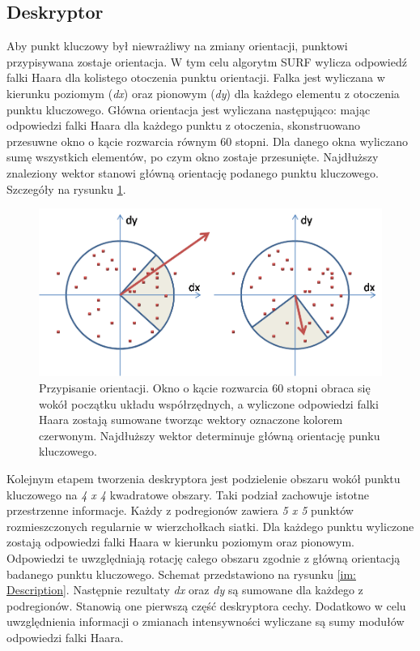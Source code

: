 \subsection{Deskryptor} 
Aby punkt kluczowy był niewrażliwy na zmiany orientacji, punktowi przypisywana zostaje orientacja. W tym celu algorytm SURF wylicza odpowiedź falki Haara dla kolistego otoczenia punktu orientacji. Falka jest wyliczana w kierunku poziomym (\textit{dx}) oraz pionowym (\textit{dy}) dla każdego elementu z otoczenia punktu kluczowego.
Główna orientacja jest wyliczana następująco: mając odpowiedzi falki Haara dla każdego punktu z otoczenia, skonstruowano przesuwne okno o kącie rozwarcia równym 60 stopni. Dla danego okna wyliczano sumę wszystkich elementów, po czym okno zostaje przesunięte. Najdłuższy znaleziony wektor stanowi główną orientację podanego punktu kluczowego. Szczegóły na rysunku \ref{im: SurfOrientationTwo}.

 \begin{figure}[h]
	\includegraphics[width=16cm]{SurfOrientationTwo}
	\centering
	\caption{Przypisanie orientacji. Okno o kącie rozwarcia 60 stopni obraca się wokół początku układu współrzędnych, a wyliczone odpowiedzi falki Haara zostają sumowane tworząc wektory oznaczone kolorem czerwonym. Najdłuższy wektor determinuje główną orientację punku kluczowego.}
	\label{im: SurfOrientationTwo}
\end{figure}

Kolejnym etapem tworzenia deskryptora jest podzielenie obszaru wokół punktu kluczowego na  \textit{4 x 4} kwadratowe obszary. Taki podział zachowuje istotne przestrzenne informacje. Każdy z podregionów zawiera \textit{5 x 5} punktów rozmieszczonych regularnie w wierzchołkach siatki. Dla każdego punktu wyliczone zostają odpowiedzi falki Haara w kierunku poziomym oraz pionowym. Odpowiedzi te uwzględniają rotację całego obszaru zgodnie z główną orientacją badanego punktu kluczowego. Schemat przedstawiono na rysunku \ref{im: Description}. Następnie rezultaty \textit{dx} oraz \textit{dy} są sumowane dla każdego z podregionów. Stanowią one pierwszą część deskryptora cechy. Dodatkowo w celu uwzględnienia informacji o zmianach intensywności wyliczane są sumy modułów odpowiedzi falki Haara. 

